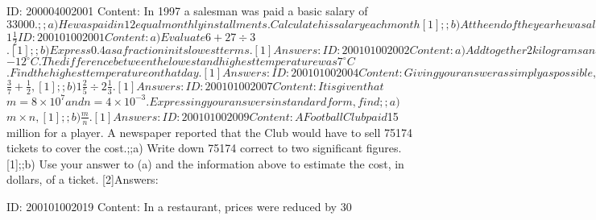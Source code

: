 \documentclass{article}
\begin{document}
ID: 200004002001
Content:
In 1997 a salesman was paid a basic salary of $33000.;;a) He was paid in 12 equal monthly installments. Calculate his salary each month [1];;b) At the end of the year he was also paid a bonus of $$1 \frac{1}{2}$$%

ID: 200101002001
Content:
a) Evaluate $$6+27\div3$$. [1];;b) Express 0.4 as a fraction in its lowest terms. [1]Answers:

ID: 200101002002
Content:
a) Add together 2 kilograms and 2 grams. Give your answer in grams. [1];;b) On a particular day, the lowest temperature was $$-12^{\circ}C$$. The difference between the lowest and highest temperature was $$7^{\circ}C$$. Find the highest temperature on that day. [1]Answers:

ID: 200101002004
Content:
Giving your answer as simply as possible, evaluate;;a) $$\frac{3}{7}+\frac{1}{2}$$, [1];;b) $$1\frac{2}{5}\div 2\frac{1}{3}$$. [1]Answers:

ID: 200101002007
Content:
It is given that $$m=8 \times 10^{7} $$ and $$n=4 \times 10^{-3}$$. Expressing your answers in standard form, find;;a) $$m \times n$$, [1];;b) $$\frac{m}{n}$$. [1]Answers:

ID: 200101002009
Content:
A Football Club paid $15 million for a player. A newspaper reported that the Club would have to sell 75174 tickets to cover the cost.;;a) Write down 75174 correct to two significant figures. [1];;b) Use your answer to (a) and the information above to estimate the cost, in dollars, of a ticket. [2]Answers:

ID: 200101002019
Content:
In a restaurant, prices were reduced by 30%
\end{document}
